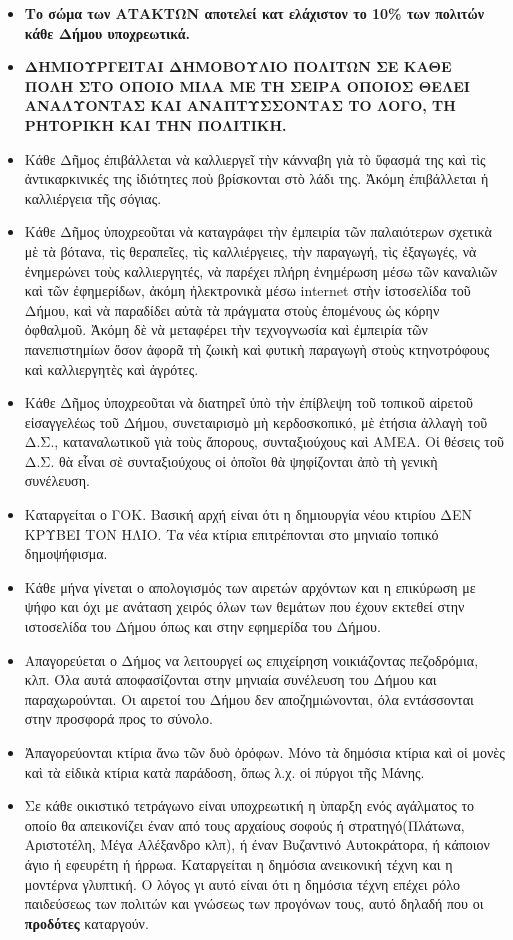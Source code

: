 \documentclass[a4paper]{article}
\begin{document}
\begin{itemize}
\item \textbf{Το σώμα των ΑΤΑΚΤΩΝ αποτελεί κατ ελάχιστον το 10\% των πολιτών κάθε Δήμου υποχρεωτικά.}
\item \textbf{ΔΗΜΙΟΥΡΓΕΙΤΑΙ ΔΗΜΟΒΟΥΛΙΟ ΠΟΛΙΤΩΝ ΣΕ ΚΑΘΕ ΠΟΛΗ ΣΤΟ ΟΠΟΙΟ ΜΙΛΑ ΜΕ ΤΗ ΣΕΙΡΑ ΟΠΟΙΟΣ ΘΕΛΕΙ ΑΝΑΛΥΟΝΤΑΣ ΚΑΙ ΑΝΑΠΤΥΣΣΟΝΤΑΣ ΤΟ ΛΟΓΟ, ΤΗ ΡΗΤΟΡΙΚΗ ΚΑΙ ΤΗΝ ΠΟΛΙΤΙΚΗ.}
\item Κάθε Δῆμος ἐπιβάλλεται νὰ καλλιεργεῖ τὴν κάνναβη γιὰ τὸ ὕφασμά της καὶ τὶς ἀντικαρκινικές της ἰδιότητες ποὺ βρίσκονται στὸ λάδι της. Ἀκόμη ἐπιβάλλεται ἡ καλλιέργεια τῆς σόγιας.
\item Κάθε Δῆμος ὑποχρεοῦται νὰ καταγράφει τὴν ἐμπειρία τῶν παλαιότερων σχετικὰ μὲ τὰ βότανα, τὶς θεραπεῖες, τὶς καλλιέργειες, τὴν παραγωγή, τὶς ἐξαγωγές, νὰ ἐνημερώνει τοὺς καλλιεργητές, νὰ παρέχει πλήρη ἐνημέρωση μέσω τῶν καναλιῶν καὶ τῶν ἐφημερίδων, ἀκόμη ἠλεκτρονικὰ μέσω internet στὴν ἰστοσελίδα τοῦ Δήμου, καὶ νὰ παραδίδει αὐτὰ τὰ πράγματα στοὺς ἑπομένους ὡς κόρην ὀφθαλμοῦ. Ἀκόμη δὲ νὰ μεταφέρει τὴν τεχνογνωσία καὶ ἐμπειρία τῶν πανεπιστημίων ὅσον ἀφορᾶ τὴ ζωικὴ καὶ φυτικὴ παραγωγὴ στοὺς κτηνοτρόφους καὶ καλλιεργητὲς καὶ ἀγρότες.
\item Κάθε Δῆμος ὑποχρεοῦται νὰ διατηρεῖ ὑπὸ τὴν ἐπίβλεψη τοῦ τοπικοῦ αἱρετοῦ εἰσαγγελέως τοῦ Δήμου, συνεταιρισμὸ μὴ κερδοσκοπικό, μὲ ἐτήσια ἀλλαγὴ τοῦ Δ.Σ., καταναλωτικοῦ γιὰ τοὺς ἄπορους, συνταξιούχους καὶ ΑΜΕΑ. Οἱ θέσεις τοῦ Δ.Σ. θὰ εἶναι σὲ συνταξιούχους οἱ ὁποῖοι θὰ ψηφίζονται ἀπὸ τὴ γενικὴ συνέλευση.
\item Καταργείται ο ΓΟΚ. Βασική αρχή είναι ότι η δημιουργία νέου κτιρίου ΔΕΝ ΚΡΥΒΕΙ ΤΟΝ ΗΛΙΟ. Τα νέα κτίρια επιτρέπονται στο μηνιαίο τοπικό δημοψήφισμα.
\item Κάθε μήνα γίνεται ο απολογισμός των αιρετών αρχόντων και η επικύρωση με ψήφο και όχι με ανάταση χειρός όλων των θεμάτων που έχουν εκτεθεί στην ιστοσελίδα του Δήμου όπως και στην εφημερίδα του Δήμου.
\item Απαγορεύεται ο Δήμος να λειτουργεί ως επιχείρηση νοικιάζοντας πεζοδρόμια, κλπ. Όλα αυτά αποφασίζονται στην μηνιαία συνέλευση του Δήμου και παραχωρούνται. Οι αιρετοί του Δήμου δεν αποζημιώνονται, όλα εντάσσονται στην προσφορά προς το σύνολο.
\item Ἀπαγορεύονται κτίρια ἄνω τῶν δυὸ ὀρόφων. Μόνο τὰ δημόσια κτίρια καὶ οἱ μονὲς καὶ τὰ εἰδικὰ κτίρια κατὰ παράδοση, ὅπως λ.χ. οἱ πύργοι τῆς Μάνης.
\item Σε κάθε οικιστικό τετράγωνο είναι υποχρεωτική η ὺπαρξη ενός αγάλματος το οποίο θα απεικονίζει έναν από τους αρχαίους σοφούς ή στρατηγό(Πλάτωνα, Αριστοτέλη, Μέγα Αλέξανδρο κλπ), ή έναν Βυζαντινό Αυτοκράτορα, ή κάποιον άγιο ή εφευρέτη ή ήρρωα. Καταργείται η δημόσια ανεικονική τέχνη και η μοντέρνα γλυπτική. Ο λόγος γι αυτό είναι ότι η δημόσια τέχνη επέχει ρόλο παιδεύσεως των πολιτών και γνώσεως των προγόνων τους, αυτό δηλαδή που οι \textbf{προδότες} καταργούν.

\end{itemize}
\end{document}
